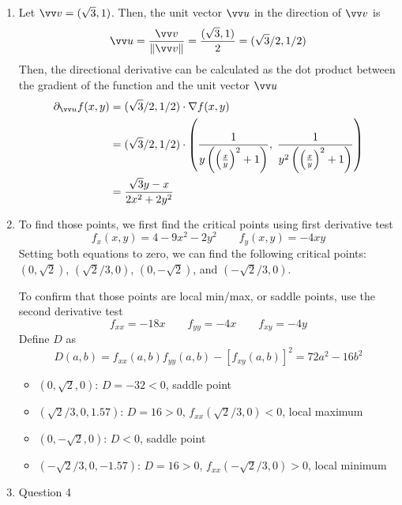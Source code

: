 \documentclass[11pt]{article}
\newcommand{\norm}[1]{\lVert #1 \rVert}
\begin{document}
\begin{enumerate}
    \item
    Let $\vv v = (\sqrt3,1)$. Then, the unit vector $\vv u$ in the direction of $\vv v$ is
    $$
    \vv u = \frac{\vv v}{\norm{\vv v}} = \frac{(\sqrt3,1)}{2} = (\sqrt3/2,1/2)
    $$
    Then, the directional derivative can be calculated as the dot product between the gradient of the function and the unit vector $\vv u$
    $$
    \begin{aligned}
        \partial_{\vv u}f(x,y) &= (\sqrt3/2, 1/2) \cdot \nabla f(x,y) \\
        &= (\sqrt3/2, 1/2) \cdot \left( \frac{1}{y\left( \left(\frac{x}{y} \right)^2 +1\right)},\; \frac{1}{y^2 \left( \left(\frac{x}{y} \right)^2 +1\right)} \right) \\
        &= \frac{\sqrt{3}y-x}{2x^2+2y^2}
    \end{aligned}
    $$
    
    \item To find those points, we first find the critical points using first derivative test
    $$
    f_x(x,y) = 4-9x^2-2y^2 \qquad f_y(x,y)=-4xy
    $$
    Setting both equations to zero, we can find the following critical points: $(0,\sqrt2)$, $(\sqrt2/3,0)$, $(0,-\sqrt2)$, and $(-\sqrt2/3,0)$.
    
    To confirm that those points are local min/max, or saddle points, use the second derivative test
    $$
    f_{xx} = -18x \qquad f_{yy} = -4x \qquad f_{xy} = -4y
    $$
    Define $D$ as
    $$
    D(a,b) = f_{xx}(a,b) f_{yy}(a,b) - \left[ f_{xy}(a,b) \right]^2 = 72a^2 - 16b^2
    $$
    \begin{itemize}
        \item $(0,\sqrt2,0)$: $D=-32<0$, saddle point
        \item $(\sqrt2/3,0,1.57)$: $D=16>0$, $f_{xx}(\sqrt2/3,0) < 0$, local maximum
        \item $(0,-\sqrt2,0)$: $D<0$, saddle point
        \item $(-\sqrt2/3,0,-1.57)$: $D=16>0$, $f_{xx}(-\sqrt2/3,0) > 0$, local minimum
    \end{itemize}
    
    \item Question 4
    

\end{enumerate}
\end{document}
